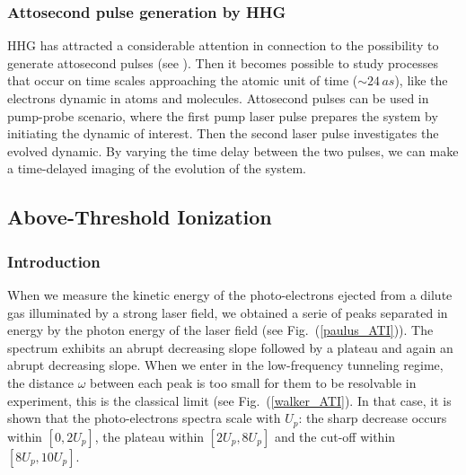 \documentclass[a4paper]{article}
\begin{document}
\subsubsection{Attosecond pulse generation by HHG}
HHG has attracted a considerable attention in connection to the possibility to generate attosecond pulses (see \cite{Ivanov_2009}).
Then it becomes possible to study processes that occur on time scales approaching the atomic unit of time ($\sim 24\,as$), like the electrons dynamic in atoms and molecules. 
Attosecond pulses can be used in pump-probe scenario, where the first pump laser pulse prepares the system by initiating the dynamic of interest. Then the second laser pulse investigates the evolved dynamic. By varying the time delay between the two pulses, we can make a time-delayed imaging of the evolution of the system.


\subsection{Above-Threshold Ionization}
\subsubsection{Introduction}

When we measure the kinetic energy of the photo-electrons ejected from a dilute gas illuminated by a strong laser field, we obtained a serie of peaks separated in energy by the photon energy of the laser field (see Fig.~(\ref{paulus_ATI})). The spectrum exhibits an abrupt decreasing slope followed by a plateau and again an abrupt decreasing slope.
When we enter in the low-frequency tunneling regime, the distance $\omega$ between each peak is too small for them to be resolvable in experiment, this is the classical limit (see Fig.~(\ref{walker_ATI}). In that case, it is shown \cite{Walker_1996} that the photo-electrons spectra scale with $U_{p}$: the sharp decrease occurs within $[0, 2U_{p}]$, the plateau within $[2U_{p}, 8U_{p}]$ and the cut-off within $[8U_{p}, 10U_{p}]$. 
\end{document}
